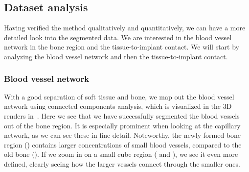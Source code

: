\subsection{Dataset analysis}

Having verified the method qualitatively and quantitatively, we can have a more
detailed look into the segmented data. We are interested in the blood vessel
network in the bone region and the tissue-to-implant contact. We will start by
analyzing the blood vessel network and then the tissue-to-implant contact.

\subsubsection{Blood vessel network}
\label{sec:blood-network}

With a good separation of soft tissue and bone, we map out the blood vessel
network using connected components analysis, which is visualized in the 3D
renders in~. Here we see that we have successfully
segmented the blood vessels out of the bone region. It is especially prominent
when looking at the capillary network, as we can see these in fine detail.
Noteworthy, the newly formed bone region () contains
larger concentrations of small blood vessels, compared to the old bone
(). If we zoom in on a small cube region
( and ), we see it even more
defined, clearly seeing how the larger vessels connect through the smaller
ones.

